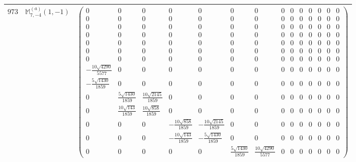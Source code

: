 \documentclass[fleqn,8pt,landscape]{jsarticle}
\begin{document}
\begin{center}
\begin{longtable}{ccc}
$ 973 $ & $ \mathbb{M}_{7,-4}^{(a)}(1,-1) $ & $ \begin{pmatrix} 0 & 0 & 0 & 0 & 0 & 0 & 0 & 0 & 0 & 0 & 0 & 0 & 0 & 0 \\ 0 & 0 & 0 & 0 & 0 & 0 & 0 & 0 & 0 & 0 & 0 & 0 & 0 & 0 \\ 0 & 0 & 0 & 0 & 0 & 0 & 0 & 0 & 0 & 0 & 0 & 0 & 0 & 0 \\ 0 & 0 & 0 & 0 & 0 & 0 & 0 & 0 & 0 & 0 & 0 & 0 & 0 & 0 \\ 0 & 0 & 0 & 0 & 0 & 0 & 0 & 0 & 0 & 0 & 0 & 0 & 0 & 0 \\ 0 & 0 & 0 & 0 & 0 & 0 & 0 & 0 & 0 & 0 & 0 & 0 & 0 & 0 \\ 0 & 0 & 0 & 0 & 0 & 0 & 0 & 0 & 0 & 0 & 0 & 0 & 0 & 0 \\ - \frac{10 \sqrt{4290}}{5577} & 0 & 0 & 0 & 0 & 0 & 0 & 0 & 0 & 0 & 0 & 0 & 0 & 0 \\ - \frac{5 \sqrt{1430}}{1859} & 0 & 0 & 0 & 0 & 0 & 0 & 0 & 0 & 0 & 0 & 0 & 0 & 0 \\ 0 & \frac{5 \sqrt{1430}}{1859} & \frac{10 \sqrt{2145}}{1859} & 0 & 0 & 0 & 0 & 0 & 0 & 0 & 0 & 0 & 0 & 0 \\ 0 & \frac{10 \sqrt{143}}{1859} & \frac{10 \sqrt{858}}{1859} & 0 & 0 & 0 & 0 & 0 & 0 & 0 & 0 & 0 & 0 & 0 \\ 0 & 0 & 0 & - \frac{10 \sqrt{858}}{1859} & - \frac{10 \sqrt{2145}}{1859} & 0 & 0 & 0 & 0 & 0 & 0 & 0 & 0 & 0 \\ 0 & 0 & 0 & - \frac{10 \sqrt{143}}{1859} & - \frac{5 \sqrt{1430}}{1859} & 0 & 0 & 0 & 0 & 0 & 0 & 0 & 0 & 0 \\ 0 & 0 & 0 & 0 & 0 & \frac{5 \sqrt{1430}}{1859} & \frac{10 \sqrt{4290}}{5577} & 0 & 0 & 0 & 0 & 0 & 0 & 0 \end{pmatrix} $ \\ \hline

\end{longtable}
\end{center}
\end{document}
